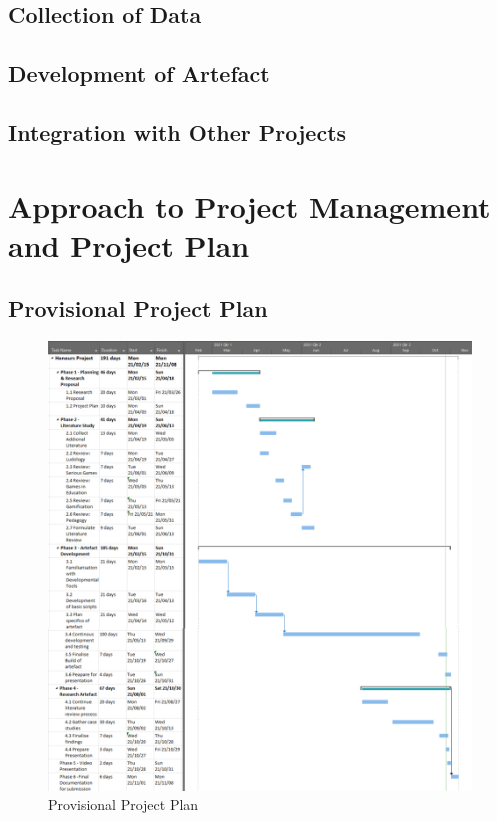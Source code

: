 \subsection{Collection of Data}
\subsection{Development of Artefact}
\subsection{Integration with Other Projects}

\section{Approach to Project Management and Project Plan}
\subsection{Provisional Project Plan}

\begin{figure}[p]
\centering
\includegraphics[scale=1.3]{gantt}
\caption{Provisional Project Plan}
\end{figure}

